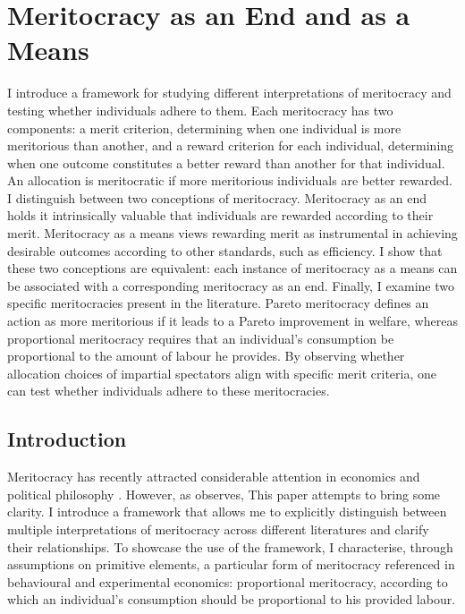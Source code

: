\chapter{Meritocracy as an End and as a Means}\label{ch:meritocracy}

\begin{chapterabstract}
	I introduce a framework for studying different interpretations of meritocracy and testing whether individuals adhere to them. Each meritocracy has two components: a merit criterion, determining when one individual is more meritorious than another, and a reward criterion for each individual, determining when one outcome constitutes a better reward than another for that individual. An allocation is meritocratic if more meritorious individuals are better rewarded. I distinguish between two conceptions of meritocracy. Meritocracy as an end holds it intrinsically valuable that individuals are rewarded according to their merit. Meritocracy as a means views rewarding merit as instrumental in achieving desirable outcomes according to other standards, such as efficiency. I show that these two conceptions are equivalent: each instance of meritocracy as a means can be associated with a corresponding meritocracy as an end. Finally, I examine two specific meritocracies present in the literature. Pareto meritocracy defines an action as more meritorious if it leads to a Pareto improvement in welfare, whereas proportional meritocracy requires that an individual’s consumption be proportional to the amount of labour he provides. By observing whether allocation choices of impartial spectators align with specific merit criteria, one can test whether individuals adhere to these meritocracies.
\end{chapterabstract}

\section{Introduction}\label{sec:intromerit}

Meritocracy has recently attracted considerable attention in economics and political philosophy \citep{markovitsMeritocracyTrap2019,mulliganJusticeMeritocraticState2018,sandelTyrannyMeritWhat2020, tiroleMeritocracySocialJustice2022}. However, as \citet[p. 5]{senMeritJustice2000} observes,  This paper attempts to bring some clarity. I introduce a framework that allows me to explicitly distinguish between multiple interpretations of meritocracy across different literatures and clarify their relationships. To showcase the use of the framework, I characterise, through assumptions on primitive elements, a particular form of meritocracy referenced in behavioural and experimental economics: proportional meritocracy, according to which an individual's consumption should be proportional to his provided labour.

